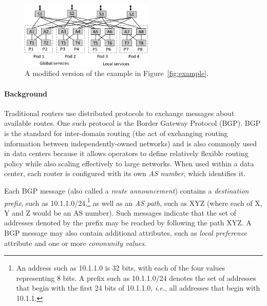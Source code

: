 \documentclass{sig-alternate-10pt}
\newcommand{\IE}{\emph{i.e.}}
\begin{document}
\begin{figure}[t!]
  \centering
  \includegraphics[width=2.5in]{figures/example2}
  \caption{A modified version of the example in Figure~\ref{fig:example}.}
  \label{fig:example2}
  \vspace{-1em}
\end{figure}

\paragraph*{Background}  Traditional routers use 
distributed protocols to exchange messages about available routes. 
One such protocol is the Border Gateway Protocol (BGP).  BGP is the
standard for inter-domain routing (the act of exchanging routing information 
between independently-owned networks) and is also commonly used in
data centers because it allows operators to define relatively flexible
routing policy while also scaling effectively to large networks.
When used within a data center, each router is configured with its own \emph{AS number},
which identifies it.

Each BGP message (also called a \emph{route announcement}) contains a 
\emph{destination prefix}, such as 10.1.1.0/24,\footnote{An address
such as 10.1.1.0 is 32 bits, with each of the four values representing 8 bits.  
A prefix such
as 10.1.1.0/24 denotes the set of addresses that begin with the first
24 bits of 10.1.1.0, \IE, all addresses that begin with 10.1.1.} as well as an
\emph{AS path}, such as XYZ (where each of X, Y and Z would be an AS number).  
Such messages indicate that the set of addresses
denoted by the prefix may be reached by following the path XYZ. 
A BGP message may also contain additional attributes, such as 
\emph{local preference} attribute and one or more
\emph{community values}.
\end{document}
